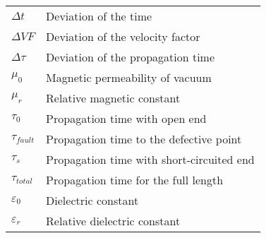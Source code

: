 \begin{table}[h]
\begin{tabular}{@{}ll@{}}
        \( \Delta t \) & Deviation of the time\\
        \( \Delta VF \) & Deviation of the velocity factor\\
        \( \Delta \tau \) & Deviation of the propagation time\\
        \( \mu_0 \) & Magnetic permeability of vacuum\\
        \( \mu_r \) & Relative magnetic constant\\
		\( \tau_0 \) & Propagation time with open end\\
		\( \tau_{fault} \) & Propagation time to the defective point\\
		\( \tau_s \) & Propagation time with short-circuited end\\
        \( \tau_{total} \) & Propagation time for the full length\\
        \( \varepsilon_0 \) & Dielectric constant\\
		\( \varepsilon_r \) & Relative dielectric constant\\
    \end{tabular}
    \label{tab:glossar}
\end{table}